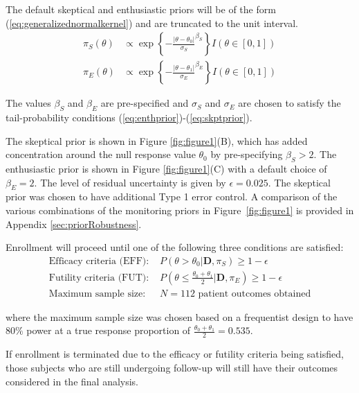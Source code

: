 \documentclass[12pt]{article}
\begin{document}
The default skeptical and enthusiastic priors will be of the form (\ref{eq:generalizednormalkernel}) and are truncated to the unit interval. 
\begin{align}
\pi_S(\theta)&\propto \exp\left\{-\frac{|\theta-\theta_0|}{\sigma_S}^{\beta_S}\right\} I(\theta\in[0,1]) \label{eq:ex1skptprior}\\
\pi_E(\theta)&\propto \exp\left\{-\frac{|\theta-\theta_1|}{\sigma_E}^{\beta_E}\right\} I(\theta\in[0,1])\label{eq:ex1enthprior}
\end{align}

The values $\beta_S$ and $\beta_E$ are pre-specified and $\sigma_S$ and $\sigma_E$ are chosen to satisfy the tail-probability conditions 
(\ref{eq:enthprior})-(\ref{eq:skptprior}).

The skeptical prior is shown in Figure \ref{fig:figure1}(B), which has added concentration around the null response value $\theta_0$ by pre-specifying $\beta_S>2$. The enthusiastic prior is shown in Figure \ref{fig:figure1}(C) with a default choice of $\beta_E=2$. The level of residual uncertainty is given by $\epsilon=0.025$. The skeptical prior was chosen to have additional Type 1 error control. A comparison of the various combinations of the monitoring priors in Figure~\ref{fig:figure1} is provided in Appendix \ref{sec:priorRobustness}.

Enrollment will proceed until one of the following three conditions are satisfied:
\begin{align}
\text{Efficacy criteria (EFF): }&P(\theta>\theta_0|\mathbf{D},\pi_S)\geq 1-\epsilon \label{eq:ex1efficacy}\\
\text{Futility criteria (FUT): }&P\left(\theta\leq\frac{\theta_0+\theta_1}{2} \Big|\mathbf{D},\pi_E\right)\geq 1-\epsilon \label{eq:ex1futility}\\
\text{Maximum sample size: }&N=112 \text{ patient outcomes obtained}\label{eq:ex1maxss}
\end{align}

where the maximum sample size was chosen based on a frequentist design to have $80\%$ power at a true response proportion of $\frac{\theta_0+\theta_1}{2}=0.535$.

If enrollment is terminated due to the efficacy or futility criteria being satisfied, those subjects who are still undergoing follow-up will still have their outcomes considered in the final analysis.
\end{document}
